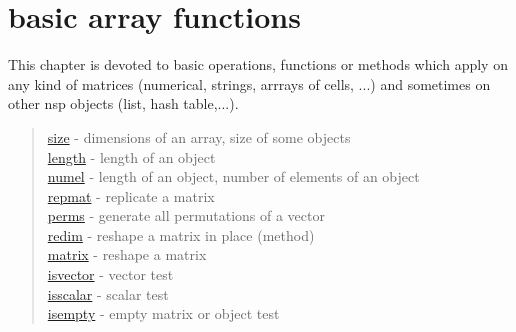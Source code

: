 \chapter*{basic array functions}

This chapter is devoted to basic operations, functions or methods which apply on
any kind of matrices (numerical, strings, arrrays of cells, ...) and sometimes
on other nsp objects (list, hash table,...).

\begin{quote}
\noindent
\hyperlink{size}{size} - dimensions of an array, size of some objects \\
\hyperlink{length}{length} - length of an object  \\
\hyperlink{numel}{numel} - length of an object, number of elements of an object  \\
\hyperlink{repmat}{repmat} - replicate a matrix\\
\hyperlink{perms}{perms} - generate all permutations of a vector\\
\hyperlink{redim}{redim} - reshape a matrix in place (method)\\
\hyperlink{matrix}{matrix} - reshape a matrix\\
\hyperlink{isvector}{isvector} - vector test\\
\hyperlink{isscalar}{isscalar} - scalar test\\
\hyperlink{isempty}{isempty} - empty matrix or object test\\
\end{quote}

%






